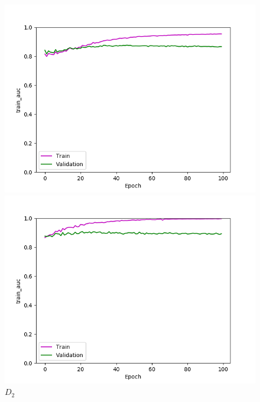 \def\year{2017}\relax \documentclass[letterpaper]{article}
\begin{document}
\begin{figure}
\centering
\begin{minipage}{.24\textwidth}
  \centering
\includegraphics[width=\textwidth]{pics/d1_train_auc_best_train_test.png}
\caption{$D_1$}\label{fig:d1acctraintest}
\end{minipage}
\begin{minipage}{.01\textwidth}
\end{minipage}
\begin{minipage}{.24\textwidth}
  \centering
\includegraphics[width=\textwidth]{pics/d2_train_auc_best_train_test.png}
\caption{$D_2$}\label{fig:d2acctraintest}
\end{minipage}
\begin{minipage}{.24\textwidth}

\end{minipage}
\end{figure}
\end{document}
